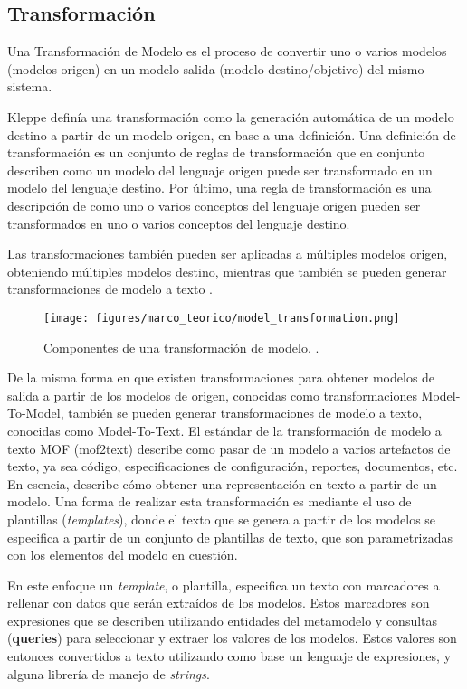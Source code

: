 \subsection{Transformación}
Una Transformación de Modelo es el proceso de convertir uno o varios modelos (modelos origen) en un modelo salida (modelo destino/objetivo) del mismo sistema.

Kleppe \cite{kleppe2003mda} definía una transformación como la generación automática de un modelo destino a partir de un modelo origen, en base a una definición. Una definición de transformación es un conjunto de reglas de transformación que en conjunto describen como un modelo del lenguaje origen puede ser transformado en un modelo del lenguaje destino. Por último, una regla de transformación es una descripción de como uno o varios conceptos del lenguaje origen pueden ser transformados en uno o varios conceptos del lenguaje destino.

Las transformaciones también pueden ser aplicadas a múltiples modelos origen, obteniendo múltiples modelos destino, mientras que también se pueden generar transformaciones de modelo a texto \cite{mens2006taxonomy}.

\begin{figure}[htbp]
    \centering
    \texttt{[image: figures/marco\_teorico/model\_transformation.png]}
    \caption{Componentes de una transformación de modelo. \cite{biehl2010literature}.}
    \label{fig:marco:transformation}
\end{figure}

De la misma forma en que existen transformaciones para obtener modelos de salida a partir de los modelos de origen, conocidas como transformaciones Model-To-Model, también se pueden generar transformaciones de modelo a texto, conocidas como Model-To-Text. El estándar de la transformación de modelo a texto MOF (mof2text) describe como pasar de un modelo a varios artefactos de texto, ya sea código, especificaciones de configuración, reportes, documentos, etc. En esencia, describe cómo obtener una representación en texto a partir de un modelo. Una forma de realizar esta transformación es mediante el uso de plantillas (\textit{templates}), donde el texto que se genera a partir de los modelos se especifica a partir de un conjunto de plantillas de texto, que son parametrizadas con los elementos del modelo en cuestión. \cite{mof_model2text}

En este enfoque un \textit{template}, o plantilla, especifica un texto con marcadores a rellenar con datos que serán extraídos de los modelos. Estos marcadores son expresiones que se describen utilizando entidades del metamodelo y consultas (\textbf{queries}) para seleccionar y extraer los valores de los modelos. Estos valores son entonces convertidos a texto utilizando como base un lenguaje de expresiones, y alguna librería de manejo de \textit{strings}.

